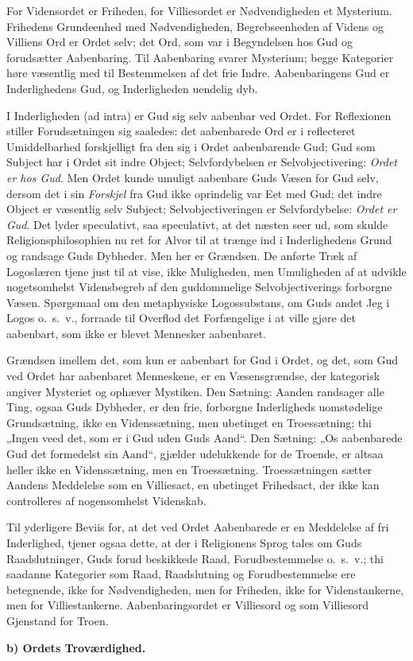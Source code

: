 \documentclass[12pt]{book}
\newcommand{\runhead}[1]{%
  \medskip\begin{center}{\bfseries #1}\end{center}\medskip}
\begin{document}
For Vidensordet er Friheden, for Villiesordet er Nødvendigheden et
Mysterium. Frihedens Grundeenhed med Nødvendigheden,
Begrebseenheden af Videns og Villiens Ord er Ordet selv; det Ord,
som var i Begyndelsen hos Gud og forudsætter Aabenbaring. Til
Aabenbaring svarer Mysterium; begge Kategorier høre væsentlig med
til Bestemmelsen af det frie Indre. Aabenbaringens Gud er
Inderlighedens Gud, og Inderligheden uendelig dyb.

I Inderligheden (ad intra) er Gud sig selv aabenbar ved Ordet. For
Reflexionen stiller Forudsætningen sig saaledes: det aabenbarede Ord
er i reflecteret Umiddelbarhed forskjelligt fra den sig i Ordet
aabenbarende Gud; Gud som Subject har i Ordet sit indre Object;
Selvfordybelsen er Selvobjectivering: \emph{Ordet er hos Gud}. Men
Ordet kunde umuligt aabenbare Guds Væsen for Gud selv, dersom det i
sin \emph{Forskjel} fra Gud ikke oprindelig var Eet med Gud; det
indre Object er væsentlig selv Subject; Selvobjectiveringen er
Selvfordybelse: \emph{Ordet er
Gud}. Det lyder speculativt, saa speculativt, at det næsten seer ud,
som skulde Religionsphilosophien nu ret for Alvor til at trænge ind
i Inderlighedens Grund og randsage Guds Dybheder. Men her er
Grændsen. De anførte Træk af Logoslæren tjene just til at vise, ikke
Muligheden, men Umuligheden af at udvikle nogetsomhelst
Vidensbegreb af den guddommelige Selvobjectiverings forborgne
Væsen. Spørgsmaal om den metaphysiske Logossubstans, om Guds andet
Jeg i Logos o.\ s.\ v., forraade til Overflod det Forfængelige i at
ville gjøre det aabenbart, som ikke er blevet Mennesker aabenbaret.

Grændsen imellem det, som kun er aabenbart for Gud i Ordet, og det,
som Gud ved Ordet har aabenbaret Menneskene, er en Væsensgrændse,
der kategorisk angiver Mysteriet og ophæver Mystiken. Den Sætning:
Aanden randsager alle Ting, ogsaa Guds Dybheder, er den frie,
forborgne Inderligheds uomstødelige Grundsætning, ikke en
Videnssætning, men ubetinget en Troessætning; thi „Ingen veed det,
som er i Gud uden Guds Aand“. Den Sætning: „Os aabenbarede Gud det
formedelst sin Aand“, gjælder udelukkende for de Troende, er altsaa
heller ikke en Videnssætning, men en Troessætning. Troessætningen
sætter Aandens Meddelelse som en Villiesact, en ubetinget
Frihedsact, der ikke kan controlleres af nogensomhelst Videnskab.

Til yderligere Beviis for, at det ved Ordet Aabenbarede er en
Meddelelse af fri Inderlighed, tjener ogsaa dette, at der i
Religionens Sprog tales om Guds Raadslutninger, Guds forud
beskikkede Raad, Forudbestemmelse o.\ s.\ v.; thi saadanne
Kategorier som Raad, Raadslutning og Forudbestemmelse ere
betegnende, ikke for Nødvendigheden, men for Friheden, ikke for
Videnstankerne, men for Villiestankerne. Aabenbaringsordet er
Villiesord og som Villiesord Gjenstand for Troen.
\runhead{b) Ordets Troværdighed.}
\end{document}
